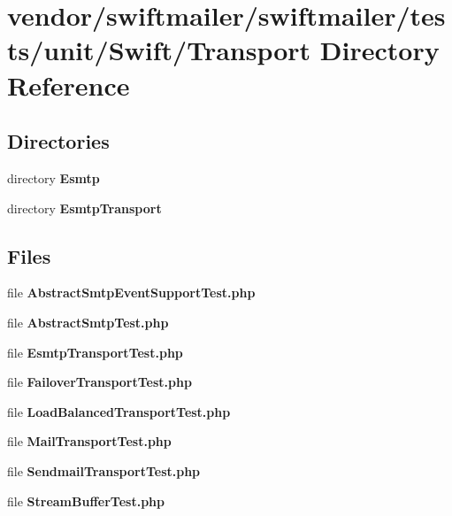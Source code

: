 \section{vendor/swiftmailer/swiftmailer/tests/unit/\+Swift/\+Transport Directory Reference}
\label{dir_590c603ab9f3978cfacb04c6556e4310}
\subsection*{Directories}
\begin{DoxyCompactItemize}
\item 
directory {\bf Esmtp}
\item 
directory {\bf Esmtp\+Transport}
\end{DoxyCompactItemize}
\subsection*{Files}
\begin{DoxyCompactItemize}
\item 
file {\bf Abstract\+Smtp\+Event\+Support\+Test.\+php}
\item 
file {\bf Abstract\+Smtp\+Test.\+php}
\item 
file {\bf Esmtp\+Transport\+Test.\+php}
\item 
file {\bf Failover\+Transport\+Test.\+php}
\item 
file {\bf Load\+Balanced\+Transport\+Test.\+php}
\item 
file {\bf Mail\+Transport\+Test.\+php}
\item 
file {\bf Sendmail\+Transport\+Test.\+php}
\item 
file {\bf Stream\+Buffer\+Test.\+php}
\end{DoxyCompactItemize}

